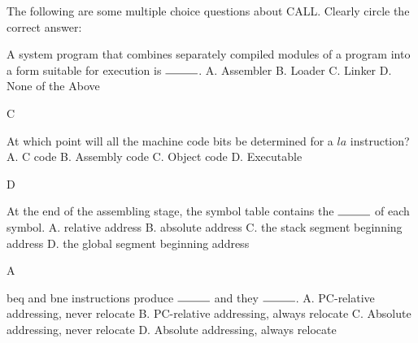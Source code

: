 \begin{blocksection}
\question The following are some multiple choice questions about CALL. Clearly circle the correct answer: 

\begin{parts}
\item 
A system program that combines separately compiled modules of a program into a form suitable for execution is $\rule{1cm}{0.15mm}$. \newline
A. Assembler \newline
B. Loader \newline
C. Linker \newline
D. None of the Above 

\begin{solution}
    C
\end{solution}

\item
At which point will all the machine code bits be determined for a $la$ instruction? \newline
A. C code \newline
B. Assembly code \newline
C. Object code \newline
D. Executable 

\begin{solution}
    D
\end{solution}

\item
At the end of the assembling stage, the symbol table contains the $\rule{1cm}{0.15mm}$ of each symbol. \newline
A. relative address \newline
B. absolute address \newline
C. the stack segment beginning address \newline
D. the global segment beginning address 

\begin{solution}
    A
\end{solution}

\item
beq and bne instructions produce $\rule{1cm}{0.15mm}$ and they $\rule{1cm}{0.15mm}$. \newline
A. PC-relative addressing, never relocate \newline
B. PC-relative addressing, always relocate \newline
C. Absolute addressing, never relocate \newline
D. Absolute addressing, always relocate 


\end{parts}
\end{blocksection}
